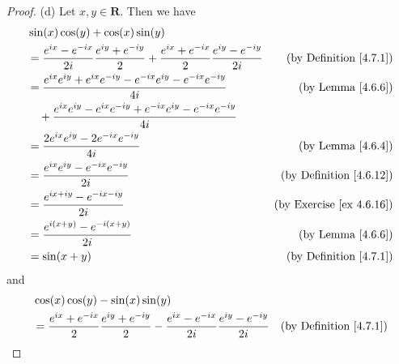 \begin{proof}{(d)}
    Let \(x, y \in \mathbf{R}\).
    Then we have
    \begin{align*}
         & \sin(x) \cos(y) + \cos(x) \sin(y)                                                                                                                                     \\
         & = \frac{e^{i x} - e^{- i x}}{2 i} \frac{e^{i y} + e^{- i y}}{2} + \frac{e^{i x} + e^{- i x}}{2} \frac{e^{i y} - e^{- i y}}{2i} & \text{(by Definition \ref{4.7.1})}   \\
         & = \frac{e^{i x} e^{i y} + e^{i x} e^{- i y} - e^{- i x} e^{i y} - e^{- i x} e^{- i y}}{4i}                                     & \text{(by Lemma \ref{4.6.6})}        \\
         & \quad + \frac{e^{i x} e^{i y} - e^{i x} e^{- i y} + e^{- i x} e^{i y} - e^{- i x} e^{- i y}}{4i}                                                                      \\
         & = \frac{2 e^{i x} e^{i y} - 2 e^{- i x} e^{- i y}}{4i}                                                                         & \text{(by Lemma \ref{4.6.4})}        \\
         & = \frac{e^{i x} e^{i y} - e^{- i x} e^{- i y}}{2i}                                                                             & \text{(by Definition \ref{4.6.12})}  \\
         & = \frac{e^{i x + i y} - e^{- i x - i y}}{2i}                                                                                   & \text{(by Exercise \ref{ex 4.6.16})} \\
         & = \frac{e^{i (x + y)} - e^{- i (x + y)}}{2i}                                                                                   & \text{(by Lemma \ref{4.6.6})}        \\
         & = \sin(x + y)                                                                                                                  & \text{(by Definition \ref{4.7.1})}
    \end{align*}
    and
    \begin{align*}
         & \cos(x) \cos(y) - \sin(x) \sin(y)                                                                                                                                    \\
         & = \frac{e^{i x} + e^{- i x}}{2} \frac{e^{i y} + e^{- i y}}{2} - \frac{e^{i x} - e^{- i x}}{2i} \frac{e^{i y} - e^{- i y}}{2i} & \text{(by Definition \ref{4.7.1})}   \\

\end{align*}
\end{proof}
